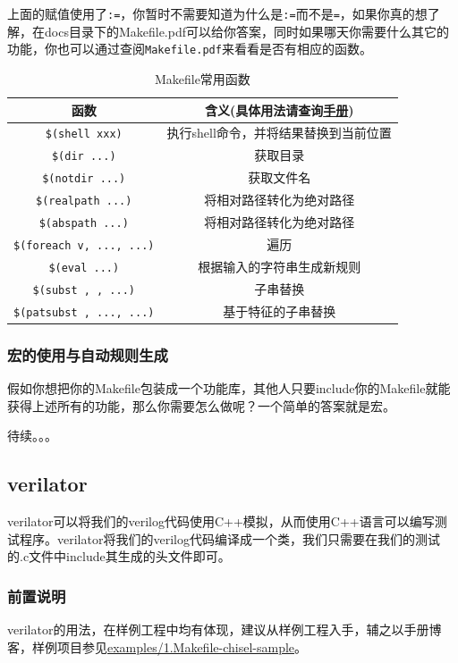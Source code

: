 \documentclass[lang=cn,11pt,a4paper]{elegantpaper}
\begin{document}
上面的赋值使用了\lstinline!:=!，你暂时不需要知道为什么是\lstinline!:=!而不是\lstinline!=!，如果你真的想了解，在docs目录下的Makefile.pdf可以给你答案，同时如果哪天你需要什么其它的功能，你也可以通过查阅\lstinline!Makefile.pdf!来看看是否有相应的函数。

\begin{table}[htbp]
\centering
\begin{tabular}{|c|c|}
\hline
函数&含义(具体用法请查询\href{run:../manuals/Makefile.pdf}{手册}) \\\hline
\lstinline|$(shell xxx)| & 执行shell命令，并将结果替换到当前位置 \\\hline
\lstinline|$(dir ...)| & 获取目录 \\\hline
\lstinline|$(notdir ...)| & 获取文件名 \\\hline
\lstinline|$(realpath ...)| & 将相对路径转化为绝对路径 \\\hline
\lstinline|$(abspath ...)| & 将相对路径转化为绝对路径 \\\hline
\lstinline|$(foreach v, ..., ...)| & 遍历 \\\hline
\lstinline|$(eval ...)| & 根据输入的字符串生成新规则 \\\hline
\lstinline|$(subst , , ...)| & 子串替换 \\\hline
\lstinline|$(patsubst , ..., ...)| & 基于特征的子串替换 \\\hline
\end{tabular}
\caption{Makefile常用函数}
\end{table}

\subsubsection{宏的使用与自动规则生成}

假如你想把你的Makefile包装成一个功能库，其他人只要include你的Makefile就能获得上述所有的功能，那么你需要怎么做呢？一个简单的答案就是宏。

待续。。。

\subsection{verilator}\label{verilator}
verilator可以将我们的verilog代码使用C++模拟，从而使用C++语言可以编写测试程序。verilator将我们的verilog代码编译成一个类，我们只需要在我们的测试的.c文件中include其生成的头文件即可。

\subsubsection{前置说明}
verilator的用法，在样例工程中均有体现，建议从样例工程入手，辅之以手册博客，样例项目参见\href{run:../examples/1.Makefile-chisel-sample}{examples/1.Makefile-chisel-sample}。
\end{document}
